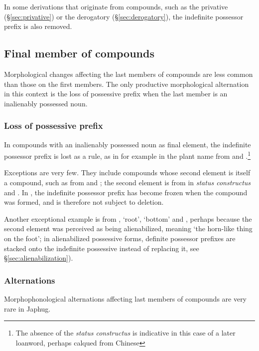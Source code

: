 In some derivations that originate from compounds, such as the privative (§\ref{sec:privative}) or the derogatory  (§\ref{sec:derogatory}), the indefinite possessor prefix is also removed.

\subsection{Final member of compounds} \label{sec:final.compounds}
Morphological changes affecting the last members of compounds are less common than those on the first members. The only productive morphological alternation in this context is the loss of possessive prefix when the last member is an inalienably possessed noun.

\subsubsection{Loss of possessive prefix} \label{sec:possessive.prefix.second.compounds}
In compounds with an inalienably possessed noun as final element, the indefinite possessor prefix is lost as a rule, as in for example in the plant name \textit{} from  and .\footnote{The absence of the \textit{status constructus}  is indicative in this case of a later loanword, perhaps calqued from Chinese 


}

Exceptions are very few. They include compounds whose second element is itself a compound, such as \textit{} from  and ; the second element is from  in \textit{status constructus} and . In \textit{}, the indefinite possessor prefix  has become frozen when the compound  was formed, and is therefore not subject to deletion.

Another exceptional example is  from , `root', `bottom' and , perhaps because the second element was perceived as being alienabilized, meaning `the horn-like thing on the foot'; in alienabilized possessive forms, definite possessor prefixes are stacked onto the indefinite possessive instead of replacing it,  see §\ref{sec:alienabilization}).

\subsubsection{Alternations} \label{sec:second.member.alternation} 
Morphophonological alternations affecting last members of compounds are very rare in Japhug. 

